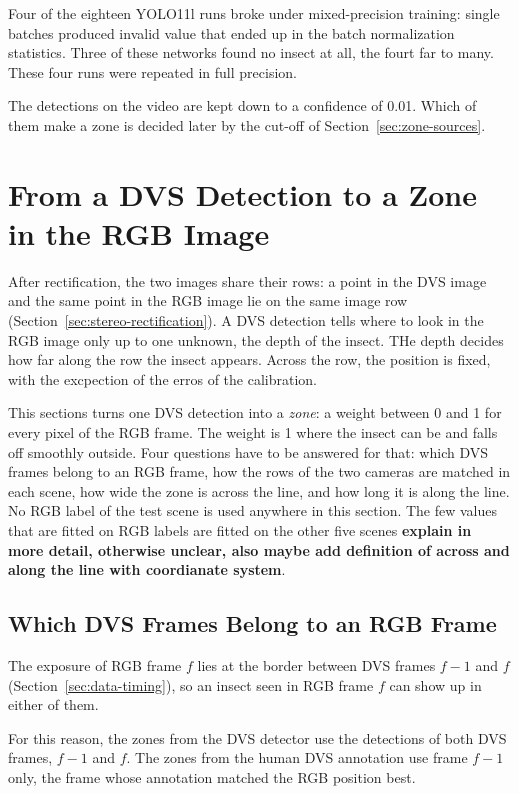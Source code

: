 Four of the eighteen YOLO11l runs broke under mixed-precision training: single batches produced invalid value 
that ended up in the batch normalization statistics. Three of these networks found no insect at all, the fourt 
far to many. These four runs were repeated in full precision.

The detections on the video are kept down to a confidence of 0.01. Which of them make a zone is decided later by
the cut-off of Section~\ref{sec:zone-sources}.

\section{From a DVS Detection to a Zone in the RGB Image}
\label{sec:probability-zones}

After rectification, the two images share their rows: a point in the DVS image and the same point in the RGB 
image lie on the same image row (Section~\ref{sec:stereo-rectification}). A DVS detection tells where to look in
the RGB image only up to one unknown, the depth of the insect. THe depth decides how far along the row the insect
appears. Across the row, the position is fixed, with the excpection of the erros of the calibration.

This sections turns one DVS detection into a \emph{zone}: a weight between 0 and 1 for every pixel of the RGB
frame. The weight is 1 where the insect can be and falls off smoothly outside. Four questions have to be 
answered for that: which DVS frames belong to an RGB frame, how the rows of the two cameras are matched in each 
scene, how wide the zone is across the line, and how long it is along the line. No RGB label of the test scene 
is used anywhere in this section. The few values that are fitted on RGB labels are fitted on the other five 
scenes \textbf{explain in more detail, otherwise unclear, also maybe add definition of across and along the line with coordianate system}.

\subsection{Which DVS Frames Belong to an RGB Frame}
\label{sec:zone-timing}

The exposure of RGB frame $f$ lies at the border between DVS frames $f-1$ and $f$ 
(Section~\ref{sec:data-timing}), so an insect seen in RGB frame $f$ can show up in either of them. 

For this reason, the zones from the DVS detector use the detections of both DVS frames, $f-1$ and $f$. The zones
from the human DVS annotation use frame $f-1$ only, the frame whose annotation matched the RGB position best.

